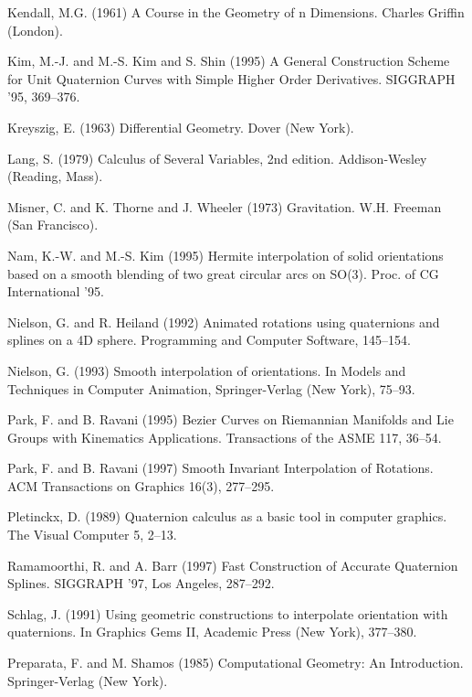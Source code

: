 \begin{thebibliography}{Lozano-Perez 83}
Kendall, M.G. (1961)
A Course in the Geometry of n Dimensions.
Charles Griffin (London).

Kim, M.-J. and M.-S. Kim and S. Shin (1995)
A General Construction Scheme for Unit Quaternion Curves
with Simple Higher Order Derivatives.
SIGGRAPH '95, 369--376.

Kreyszig, E. (1963)
Differential Geometry.
Dover (New York).

Lang, S. (1979)
Calculus of Several Variables, 2nd edition.
Addison-Wesley (Reading, Mass).

Misner, C. and K. Thorne and J. Wheeler (1973)
Gravitation.
W.H. Freeman (San Francisco).

Nam, K.-W. and M.-S. Kim (1995)
Hermite interpolation of solid orientations based on a smooth blending
of two great circular arcs on SO(3).
Proc. of CG International '95.

Nielson, G. and R. Heiland (1992)
Animated rotations using quaternions and splines on a 4D sphere.
Programming and Computer Software, 145--154.

Nielson, G. (1993)
Smooth interpolation of orientations.
In Models and Techniques in Computer Animation, Springer-Verlag (New York),
75--93.

Park, F. and B. Ravani (1995)
Bezier Curves on Riemannian Manifolds and Lie Groups with
Kinematics Applications.
Transactions of the ASME 117, 36--54.

Park, F. and B. Ravani (1997)
Smooth Invariant Interpolation of Rotations.
ACM Transactions on Graphics 16(3), 277--295.

Pletinckx, D. (1989) 
Quaternion calculus as a basic tool in computer graphics.
The Visual Computer 5, 2--13.

Ramamoorthi, R. and A. Barr (1997)
Fast Construction of Accurate Quaternion Splines.
SIGGRAPH '97, Los Angeles, 287--292.

Schlag, J. (1991) Using geometric constructions to interpolate
orientation with quaternions.  In Graphics Gems II, Academic Press (New York),
377--380.

Preparata, F. and M. Shamos (1985)
Computational Geometry: An Introduction.
Springer-Verlag (New York).


\end{thebibliography}
